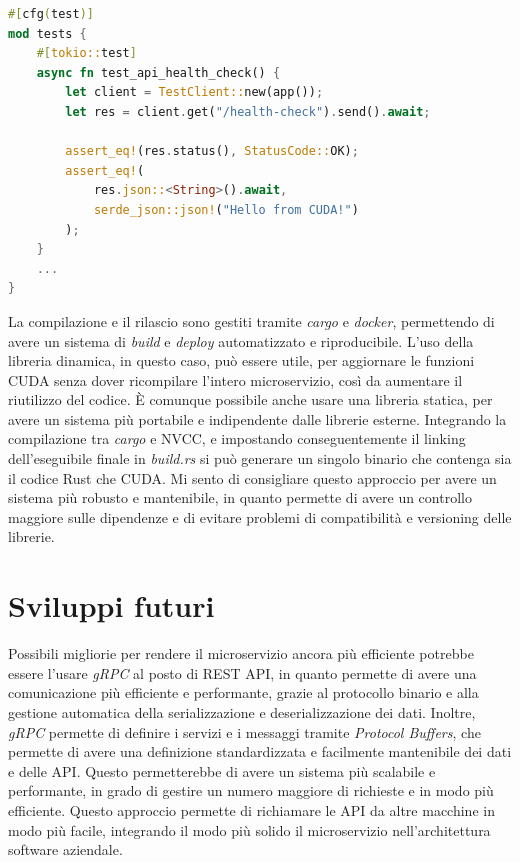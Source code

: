 \vspace{5mm}
\begin{lstlisting}[language=rust, caption=Health check test, label=lis:health_check]
#[cfg(test)]
mod tests {
    #[tokio::test]
    async fn test_api_health_check() {
        let client = TestClient::new(app());
        let res = client.get("/health-check").send().await;

        assert_eq!(res.status(), StatusCode::OK);
        assert_eq!(
            res.json::<String>().await,
            serde_json::json!("Hello from CUDA!")
        );
    }
    ...
}
\end{lstlisting}
\vspace{5mm}



La compilazione e il rilascio sono gestiti tramite \textit{cargo} e \textit{docker}, permettendo di avere un sistema di \textit{build} e \textit{deploy} automatizzato e riproducibile. L'uso della libreria dinamica, in questo caso, può essere utile, per aggiornare le funzioni \gls{CUDA} senza dover ricompilare l'intero microservizio, così da aumentare il riutilizzo del codice. È comunque possibile anche usare una libreria statica, per avere un sistema più portabile e indipendente dalle librerie esterne. Integrando la compilazione tra \textit{cargo} e \gls{NVCC}, e impostando conseguentemente il linking dell'eseguibile finale in \textit{build.rs} si può generare un singolo binario che contenga sia il codice Rust che \gls{CUDA}. Mi sento di consigliare questo approccio per avere un sistema più robusto e mantenibile, in quanto permette di avere un controllo maggiore sulle dipendenze e di evitare problemi di compatibilità e versioning delle librerie.

\section{Sviluppi futuri}



Possibili migliorie per rendere il microservizio ancora più efficiente potrebbe essere l'usare \textit{gRPC} al posto di REST \gls{API}, in quanto permette di avere una comunicazione più efficiente e performante, grazie al protocollo binario e alla gestione automatica della serializzazione e deserializzazione dei dati. Inoltre, \textit{gRPC} permette di definire i servizi e i messaggi tramite \textit{Protocol Buffers}, che permette di avere una definizione standardizzata e facilmente mantenibile dei dati e delle \gls{API}. Questo permetterebbe di avere un sistema più scalabile e performante, in grado di gestire un numero maggiore di richieste e in modo più efficiente. Questo approccio permette di richiamare le \gls{API} da altre macchine in modo più facile, integrando il modo più solido il microservizio nell'architettura software aziendale.

